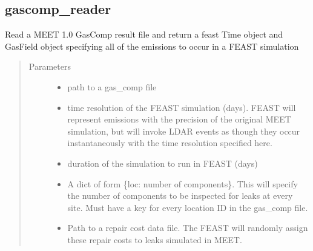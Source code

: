 \documentclass[letterpaper,10pt,english]{sphinxmanual}
\begin{document}
\subsection{gascomp\_reader}
\label{\detokenize{index:gascomp-reader}}

\begin{fulllineitems}
\label{\detokenize{index:feast.MEET_1_importer.gascomp_reader}}
Read a MEET 1.0 GasComp result file and return a feast Time object and GasField object specifying all of the
emissions to occur in a FEAST simulation
\begin{quote}\begin{description}
\item[{Parameters}] \leavevmode\begin{itemize}
\item {} 
 \textendash{} path to a gas\_comp file

\item {} 
 \textendash{} time resolution of the FEAST simulation (days). FEAST will represent emissions with the     precision of the original MEET simulation, but will invoke LDAR events as though they occur instantaneously with     the time resolution specified here.

\item {} 
 \textendash{} duration of the simulation to run in FEAST (days)

\item {} 
 \textendash{} A dict of form \{loc: number of components\}. This will specify the number of components to     be inspected for leaks at every site. Must have a key for every location ID in the gas\_comp file.

\item {} 
 \textendash{} Path to a repair cost data file. The FEAST will randomly assign these repair costs to leaks     simulated in MEET.


\end{itemize}
\end{description}
\end{quote}
\end{fulllineitems}
\end{document}
